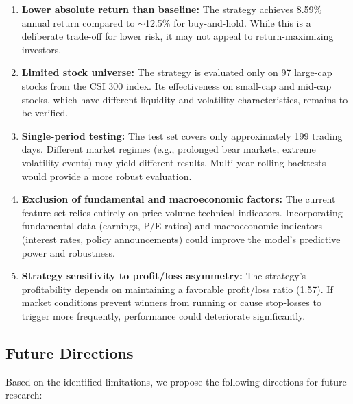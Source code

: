 \documentclass[12pt, a4paper]{article}
\begin{document}
\begin{enumerate}[leftmargin=2em]
    \item \textbf{Lower absolute return than baseline:} The strategy achieves 8.59\% annual return compared to $\sim$12.5\% for buy-and-hold. While this is a deliberate trade-off for lower risk, it may not appeal to return-maximizing investors.
    
    \item \textbf{Limited stock universe:} The strategy is evaluated only on 97 large-cap stocks from the CSI 300 index. Its effectiveness on small-cap and mid-cap stocks, which have different liquidity and volatility characteristics, remains to be verified.
    
    \item \textbf{Single-period testing:} The test set covers only approximately 199 trading days. Different market regimes (e.g., prolonged bear markets, extreme volatility events) may yield different results. Multi-year rolling backtests would provide a more robust evaluation.
    
    \item \textbf{Exclusion of fundamental and macroeconomic factors:} The current feature set relies entirely on price-volume technical indicators. Incorporating fundamental data (earnings, P/E ratios) and macroeconomic indicators (interest rates, policy announcements) could improve the model's predictive power and robustness.
    
    \item \textbf{Strategy sensitivity to profit/loss asymmetry:} The strategy's profitability depends on maintaining a favorable profit/loss ratio (1.57). If market conditions prevent winners from running or cause stop-losses to trigger more frequently, performance could deteriorate significantly.
\end{enumerate}

\subsection{Future Directions}

Based on the identified limitations, we propose the following directions for future research:
\end{document}
